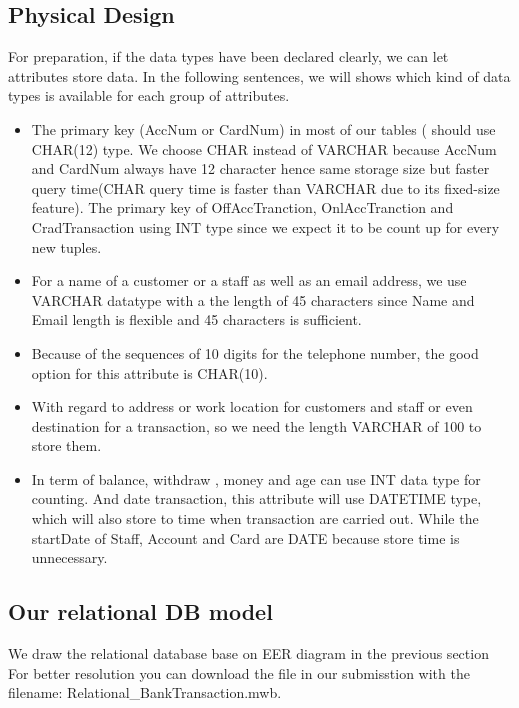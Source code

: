 \documentclass[12pt,a4paper]{article}
\begin{document}
\subsection{Physical Design}
\indent For preparation, if the data types have been declared clearly, we can let attributes store data. In the following sentences, we will shows which kind of data types is available for each group of attributes.
\begin{itemize}
    \item The primary key (AccNum or CardNum) in most of our tables ( should use CHAR(12) type. We choose CHAR instead of VARCHAR because AccNum and CardNum always have 12 character hence same storage size but faster query time(CHAR query time is faster than VARCHAR due to its fixed-size feature). The primary key of OffAccTranction, OnlAccTranction and CradTransaction using INT type since we expect it to be count up for every new tuples.
    \item For a name of a customer or a staff as well as an email address, we use VARCHAR datatype with a the length of 45 characters since Name and Email length is flexible and 45 characters is sufficient.
    \item Because of the sequences of 10 digits for the telephone number, the good option for this attribute is CHAR(10).
    \item With regard to address or work location for customers and staff or even destination for a transaction, so we need the length VARCHAR of 100 to store them.
    \item In term of balance, withdraw , money and age can use INT data type for counting. And date transaction, this attribute will use DATETIME type, which will also store to time when transaction are carried out. While the startDate of Staff, Account and Card are DATE because store time is unnecessary.
\end{itemize}

\subsection{Our relational DB model}
\indent We draw the relational database base on EER diagram in the previous section For better resolution you can download the file in our submisstion with the filename: Relational\_BankTransaction.mwb.
\end{document}
